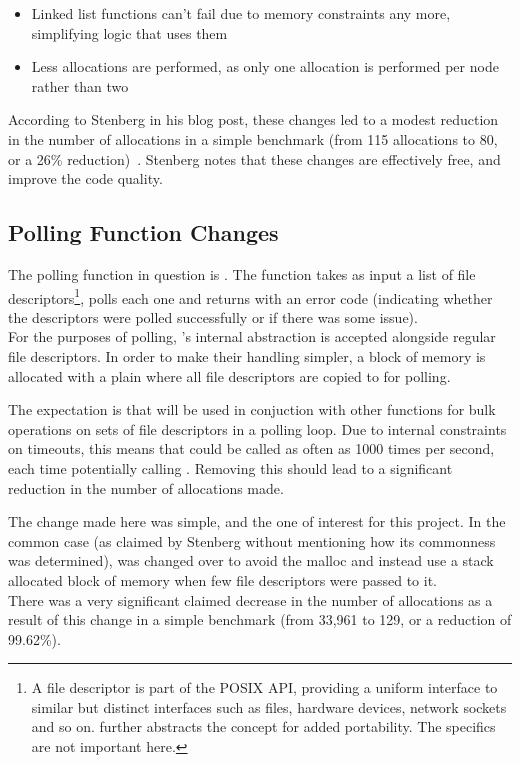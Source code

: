 \begin{itemize}
	\item Linked list functions can't fail due to memory constraints any more, simplifying logic that uses them
	\item Less allocations are performed, as only one allocation is performed per node rather than two
\end{itemize}

According to Stenberg in his blog post, these changes led to a modest reduction in the number of allocations in a simple benchmark (from 115 allocations to 80, or a 26\% reduction)~\cite{curlmalloc}. Stenberg notes that these changes are effectively free, and improve the code quality.

\subsection{Polling Function Changes}

The polling function in question is . The function takes as input a list of file descriptors\footnote{A file descriptor is part of the POSIX API, providing a uniform interface to similar but distinct interfaces such as files, hardware devices, network sockets and so on.  further abstracts the concept for added portability. The specifics are not important here.}, polls each one and returns with an error code (indicating whether the descriptors were polled successfully or if there was some issue).\\
For the purposes of polling, 's internal abstraction is accepted alongside regular file descriptors. In order to make their handling simpler, a block of memory is allocated with a plain \malloc{} where all file descriptors are copied to for polling.

The expectation is that  will be used in conjuction with other functions for bulk operations on sets of file descriptors in a polling loop. Due to internal constraints on timeouts, this means that  could be called as often as 1000 times per second, each time potentially calling \malloc{}. Removing this \malloc{} should lead to a significant reduction in the number of allocations made.

The change made here was simple, and the one of interest for this project. In the common case (as claimed by Stenberg without mentioning how its commonness was determined),  was changed over to avoid the malloc and instead use a stack allocated block of memory when few file descriptors were passed to it.\\
There was a very significant claimed decrease in the number of allocations as a result of this change in a simple benchmark (from 33,961 to 129, or a reduction of 99.62\%).

